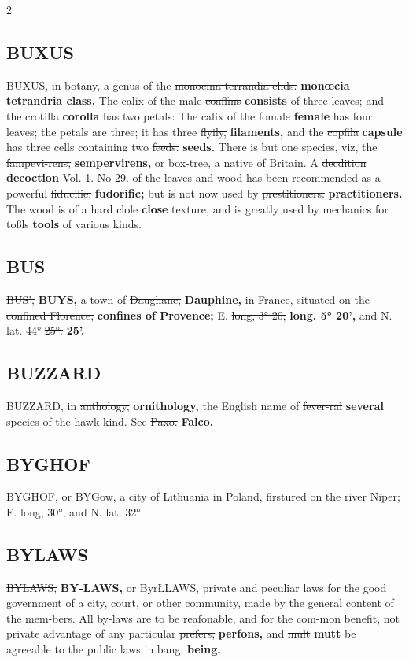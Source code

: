 \documentclass[10pt]{article}
\begin{document}
\begin{multicols}{2}
\subsection*{BUXUS}
BUXUS, in botany, a genus of the \sout{monocina terrandia elids.} \textbf{monœcia tetrandria class.} The calix of the male \sout{coaffins} \textbf{consists} of three leaves; and the \sout{crotilla} \textbf{corolla} has two petals: The calix of the \sout{fomale} \textbf{female} has four leaves; the petals are three; it has three \sout{flyily,} \textbf{filaments,} and the \sout{copfila} \textbf{capsule} has three cells containing two \sout{feeds.} \textbf{seeds.} There is but one species, viz, the \sout{fampevi-rens,} \textbf{sempervirens,} or box-tree, a native of Britain. A \sout{decdition} \textbf{decoction} Vol. 1. No 29. of the leaves and wood has been recommended as a powerful \sout{fiducifie;} \textbf{fudorific;} but is not now used by \sout{prestitioners.} \textbf{practitioners.} The wood is of a hard \sout{clole} \textbf{close} texture, and is greatly used by mechanics for \sout{toßls} \textbf{tools} of various kinds.

\subsection*{BUS}
\sout{BUS',} \textbf{BUYS,} a town of \sout{Daughane,} \textbf{Dauphine,} in France, situated on the \sout{confined Florence;} \textbf{confines of Provence;} E. \sout{long, 3° 20,} \textbf{long. 5° 20',} and N. lat. 44° \sout{25°.} \textbf{25'.}

\subsection*{BUZZARD}
BUZZARD, in \sout{anthology,} \textbf{ornithology,} the English name of \sout{fever-ral} \textbf{several} species of the hawk kind. See \sout{Paxo.} \textbf{Falco.}

\subsection*{BYGHOF}
BYGHOF, or BYGow, a city of Lithuania in Poland, firstured on the river Niper; E. long, 30°, and N. lat. 32°.

\subsection*{BYLAWS}
\sout{BYLAWS,} \textbf{BY-LAWS,} or ByrŁLAWS, private and peculiar laws for the good government of a city, court, or other community, made by the general content of the mem-bers. All by-laws are to be reafonable, and for the com-mon benefit, not private advantage of any particular \sout{prefers,} \textbf{perfons,} and \sout{mult} \textbf{mutt} be agreeable to the public laws in \sout{bang.} \textbf{being.}


\end{multicols}
\end{document}
